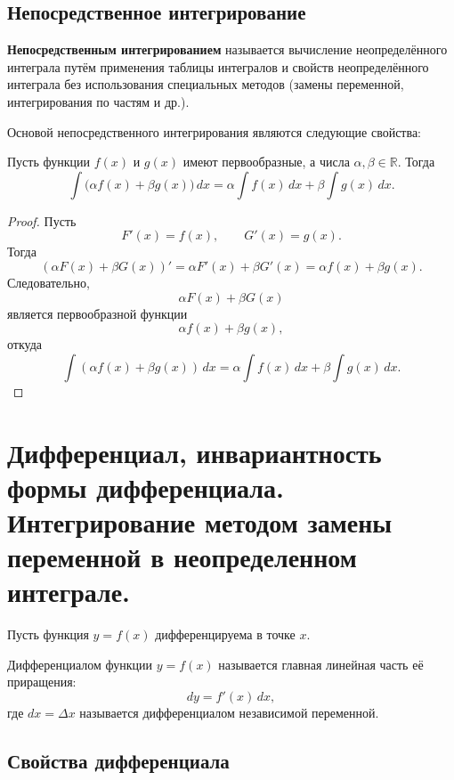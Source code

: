 \documentclass[14pt]{extreport}
\begin{document}
    \section{Непосредственное интегрирование}

    \begin{definition}
        \textbf{Непосредственным интегрированием} называется вычисление неопределённого интеграла путём применения таблицы интегралов и свойств неопределённого интеграла без использования специальных методов (замены переменной, интегрирования по частям и др.).
    \end{definition}

    Основой непосредственного интегрирования являются следующие свойства:

    \begin{theorem}
    Пусть функции $f(x)$ и $g(x)$ имеют первообразные, а числа
    $\alpha,\beta\in\mathbb R$. Тогда
    \[
    \int \bigl(\alpha f(x)+\beta g(x)\bigr)\,dx
    =
    \alpha\int f(x)\,dx+
    \beta\int g(x)\,dx.
    \]
    \end{theorem}

    \begin{proof}
    Пусть
    \[
    F'(x)=f(x), \qquad G'(x)=g(x).
    \]
    Тогда
    \[
    (\alpha F(x)+\beta G(x))'
    =
    \alpha F'(x)+\beta G'(x)
    =
    \alpha f(x)+\beta g(x).
    \]
    Следовательно,
    \[
    \alpha F(x)+\beta G(x)
    \]
    является первообразной функции
    \[
    \alpha f(x)+\beta g(x),
    \]
    откуда
    \[
    \int (\alpha f(x)+\beta g(x))\,dx
    =
    \alpha\int f(x)\,dx
    +
    \beta\int g(x)\,dx.
    \]
    \end{proof}

    \chapter{Дифференциал, инвариантность формы дифференциала. Интегрирование методом замены переменной в неопределенном интеграле.}

    Пусть функция $y=f(x)$ дифференцируема в точке $x$.

    \begin{definition}
    Дифференциалом функции $y=f(x)$ называется главная линейная часть её приращения:
    \[
    dy=f'(x)\,dx,
    \]
    где $dx=\Delta x$ называется дифференциалом независимой переменной.
    \end{definition}

    \section{Свойства дифференциала}
\end{document}
